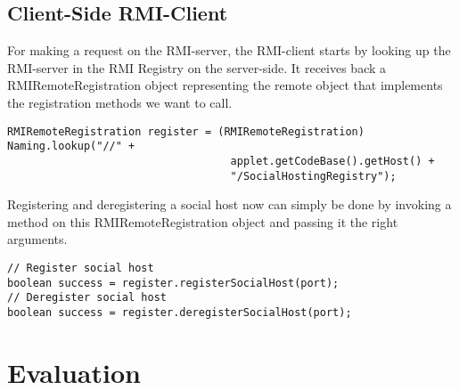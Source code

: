\documentclass[a4paper, 10pt]{article}
\begin{document}
\subsection{Client-Side RMI-Client}
For making a request on the RMI-server, the RMI-client starts by looking up the RMI-server in the RMI Registry on the server-side. It receives back a RMIRemoteRegistration object representing the remote object that implements the registration methods we want to call.
\begin{lstlisting}
RMIRemoteRegistration register = (RMIRemoteRegistration) Naming.lookup("//" + 
                                   applet.getCodeBase().getHost() +
                                   "/SocialHostingRegistry");
\end{lstlisting}
Registering and deregistering a social host now can simply be done by invoking a method on this RMIRemoteRegistration object and passing it the right arguments.
\begin{lstlisting}
// Register social host
boolean success = register.registerSocialHost(port);
// Deregister social host
boolean success = register.deregisterSocialHost(port);
\end{lstlisting}

\section{Evaluation}




\begin{lstlisting}
\end{lstlisting}
\end{document}
